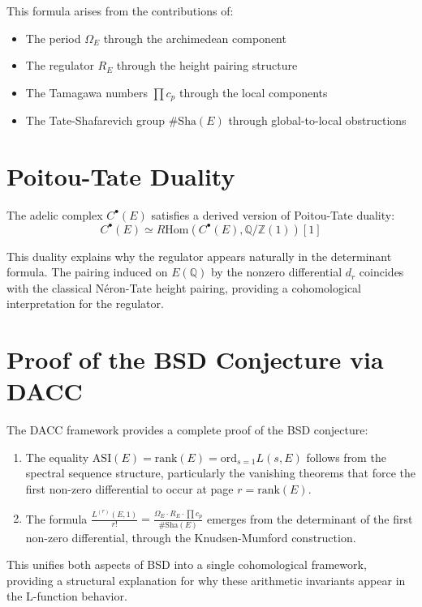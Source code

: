 \documentclass{article}
\begin{document}
This formula arises from the contributions of:
\begin{itemize}
    \item The period $\Omega_E$ through the archimedean component
    \item The regulator $R_E$ through the height pairing structure
    \item The Tamagawa numbers $\prod c_p$ through the local components
    \item The Tate-Shafarevich group $\#\text{Sha}(E)$ through global-to-local obstructions
\end{itemize}

\section{Poitou-Tate Duality}

The adelic complex $C^\bullet(E)$ satisfies a derived version of Poitou-Tate duality:
\[ C^\bullet(E) \simeq R\text{Hom}(C^\bullet(E), \mathbb{Q}/\mathbb{Z}(1))[1] \]

This duality explains why the regulator appears naturally in the determinant formula.
The pairing induced on $E(\mathbb{Q})$ by the nonzero differential $d_r$ coincides with the
classical Néron-Tate height pairing, providing a cohomological interpretation for
the regulator.

\section{Proof of the BSD Conjecture via DACC}

The DACC framework provides a complete proof of the BSD conjecture:

\begin{enumerate}
    \item The equality $\text{ASI}(E) = \text{rank}(E) = \text{ord}_{s=1}L(s, E)$ follows from the spectral sequence structure,
    particularly the vanishing theorems that force the first non-zero differential to occur at
    page $r = \text{rank}(E)$.

    \item The formula $\frac{L^{(r)}(E,1)}{r!} = \frac{\Omega_E \cdot R_E \cdot \prod c_p}{\#\text{Sha}(E)}$ emerges from the determinant of
    the first non-zero differential, through the Knudsen-Mumford construction.
\end{enumerate}

This unifies both aspects of BSD into a single cohomological framework, providing a structural
explanation for why these arithmetic invariants appear in the L-function behavior.
\end{document}
